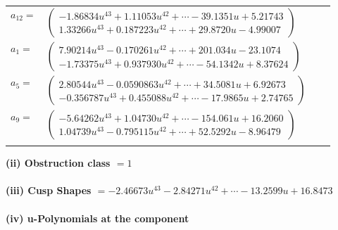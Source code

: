 \documentclass[1p]{elsarticle_modified}
\theoremstyle{definition}
\begin{document}
\begin{tabular}{m{7pt} m{180pt} m{7pt} m{180pt} }
\flushright $a_{12}=$&$\begin{pmatrix}-1.86834 u^{43}+1.11053 u^{42}+\cdots-39.1351 u+5.21743\\1.33266 u^{43}+0.187223 u^{42}+\cdots+29.8720 u-4.99007\end{pmatrix}$ \\
\flushright $a_{1}=$&$\begin{pmatrix}7.90214 u^{43}-0.170261 u^{42}+\cdots+201.034 u-23.1074\\-1.73375 u^{43}+0.937930 u^{42}+\cdots-54.1342 u+8.37624\end{pmatrix}$ \\
\flushright $a_{5}=$&$\begin{pmatrix}2.80544 u^{43}-0.0590863 u^{42}+\cdots+34.5081 u+6.92673\\-0.356787 u^{43}+0.455088 u^{42}+\cdots-17.9865 u+2.74765\end{pmatrix}$ \\
\flushright $a_{9}=$&$\begin{pmatrix}-5.64262 u^{43}+1.04730 u^{42}+\cdots-154.061 u+16.2060\\1.04739 u^{43}-0.795115 u^{42}+\cdots+52.5292 u-8.96479\end{pmatrix}$\\&\end{tabular}
\flushleft \textbf{(ii) Obstruction class $= 1$}\\~\\
\flushleft \textbf{(iii) Cusp Shapes $= -2.46673 u^{43}-2.84271 u^{42}+\cdots-13.2599 u+16.8473$}\\~\\
\newpage\renewcommand{\arraystretch}{1}
\flushleft \textbf{(iv) u-Polynomials at the component}\newline \\
\end{document}
